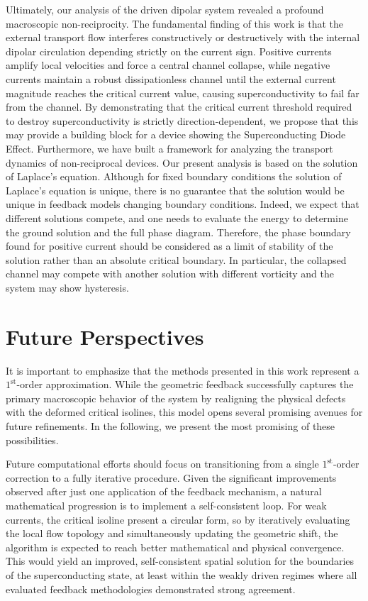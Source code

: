 \documentclass[english,binding=0.6cm,noexaminfo]{sapthesis}
\begin{document}
Ultimately, our analysis of the driven dipolar system revealed a profound macroscopic non-reciprocity. The fundamental finding of this work is that the external transport flow interferes constructively or destructively with the internal dipolar circulation depending strictly on the current sign. Positive currents amplify local velocities and force a central channel collapse, while negative currents maintain a robust dissipationless channel until the external current magnitude reaches the critical current value, causing superconductivity to fail far from the channel. By demonstrating that the critical current threshold required to destroy superconductivity is strictly direction-dependent, we propose that this may provide a building block for a device showing the Superconducting Diode Effect. Furthermore, we have built a framework for analyzing the transport dynamics of non-reciprocal devices. Our present analysis is based on the solution of Laplace's equation. Although for fixed boundary conditions the solution of Laplace's equation is unique, there is no guarantee that the solution would be unique in feedback models changing boundary conditions. Indeed, we expect that different solutions compete, and one needs to evaluate the energy to determine the ground solution and the full phase diagram. Therefore, the phase boundary found for positive current should be considered as a limit of stability of the solution rather than an absolute critical boundary. In particular, the collapsed channel may compete with another solution with different vorticity and the system may show hysteresis. 


\section{Future Perspectives}

It is important to emphasize that the methods presented in this work represent a $1^{\text{st}}$-order approximation. While the geometric feedback successfully captures the primary macroscopic behavior of the system by realigning the physical defects with the deformed critical isolines, this model opens several promising avenues for future refinements. In the following, we present the most promising of these possibilities.

Future computational efforts should focus on transitioning from a single $1^{\text{st}}$-order correction to a fully iterative procedure. Given the significant improvements observed after just one application of the feedback mechanism, a natural mathematical progression is to implement a self-consistent loop. For weak currents, the critical isoline present a circular form, so by iteratively evaluating the local flow topology and simultaneously updating the geometric shift, the algorithm is expected to reach better mathematical and physical convergence. This would yield an improved, self-consistent spatial solution for the boundaries of the superconducting state, at least within the weakly driven regimes where all evaluated feedback methodologies demonstrated strong agreement.
\end{document}
